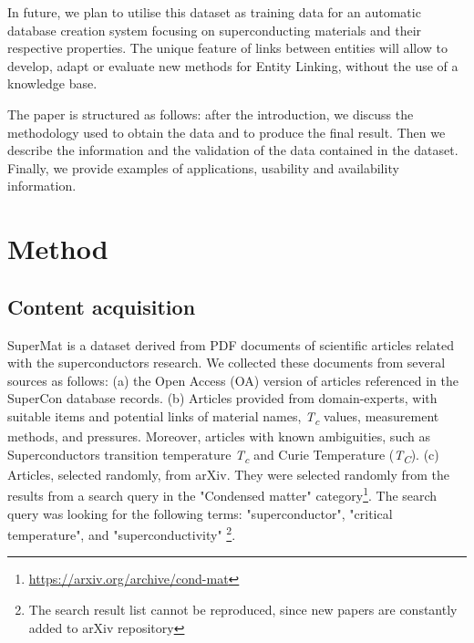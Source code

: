 \documentclass[fleqn,10pt]{wlscirep}
\begin{document}
In future, we plan to utilise this dataset as training data for an automatic database creation system focusing on superconducting materials and their respective properties. 
The unique feature of links between entities will allow to develop, adapt or evaluate new methods for Entity Linking, without the use of a knowledge base.

The paper is structured as follows: after the introduction, we discuss the methodology used to obtain the data and to produce the final result. Then we describe the information and the validation of the data contained in the dataset. Finally, we provide examples of applications, usability and availability information. 

\label{sec:method}
\section*{Method}

\label{content-acquisition}
\subsection*{Content acquisition}
SuperMat is a dataset derived from PDF documents of scientific articles related with the superconductors research. 
We collected these documents from several sources as follows: (a) the Open Access (OA) version of articles referenced in the SuperCon database records. (b) Articles provided from domain-experts, with suitable items and potential links of material names, \textit{T\textsubscript{c}} values, measurement methods, and pressures. Moreover, articles with known ambiguities, such as Superconductors transition temperature \textit{T\textsubscript{c}} and Curie Temperature (\textit{T\textsubscript{C}}).
(c) Articles, selected randomly, from arXiv. They were selected randomly from the results from a search query in the "Condensed matter" category\footnote{\url{https://arxiv.org/archive/cond-mat}}. The search query was looking for the following terms: "superconductor", "critical temperature", and "superconductivity" \footnote{The search result list cannot be reproduced, since new papers are constantly added to arXiv repository}.
\end{document}
